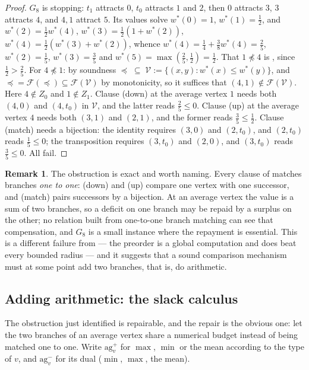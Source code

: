 \documentclass[11pt]{article}
\theoremstyle{plain}
\theoremstyle{definition}
\newtheorem{remark}[theorem]{Remark}
\begin{document}
\begin{proof}
$G_8$ is stopping: $t_1$ attracts $0$, $t_0$ attracts $1$ and $2$, then
$0$ attracts $3$, $3$ attracts $4$, and $4,1$ attract $5$. Its values
solve $w^\ast(0)=1$, $w^\ast(1)=\tfrac12$, and
$w^\ast(2)=\tfrac12w^\ast(4)$,
$w^\ast(3)=\tfrac12(1+w^\ast(2))$,
$w^\ast(4)=\tfrac12(w^\ast(3)+w^\ast(2))$, whence
$w^\ast(4)=\tfrac14+\tfrac38w^\ast(4)=\tfrac25$, $w^\ast(2)=\tfrac15$,
$w^\ast(3)=\tfrac35$ and $w^\ast(5)=\max(\tfrac25,\tfrac12)=\tfrac12$.
That $1\not\preceq4$ is , since
$\tfrac12>\tfrac25$. For $4\not\preceq1$: by soundness
$\preceq\;\subseteq\;\mathcal{V}:=\{(x,y):w^\ast(x)\le w^\ast(y)\}$, and
$\preceq=\mathcal{F}(\preceq)\subseteq\mathcal{F}(\mathcal{V})$ by
monotonicity, so it suffices that $(4,1)\notin\mathcal{F}(\mathcal{V})$.
Here $4\notin Z_0$ and $1\notin Z_1$. Clause (down) at the average vertex
$1$ needs both $(4,0)$ and $(4,t_0)$ in $\mathcal{V}$, and the latter
reads $\tfrac25\le0$. Clause (up) at the average vertex $4$ needs both
$(3,1)$ and $(2,1)$, and the former reads $\tfrac35\le\tfrac12$. Clause
(match) needs a bijection: the identity requires $(3,0)$ and $(2,t_0)$,
and $(2,t_0)$ reads $\tfrac15\le0$; the transposition requires
$(3,t_0)$ and $(2,0)$, and $(3,t_0)$ reads $\tfrac35\le0$. All fail.
\end{proof}

\begin{remark}
The obstruction is exact and worth naming. Every clause of
 matches branches \emph{one to one}: (down) and (up)
compare one vertex with one successor, and (match) pairs successors by a
bijection. At an average vertex the value is a sum of two branches, so a
deficit on one branch may be repaid by a surplus on the other; no
relation built from one-to-one branch matching can see that
compensation, and $G_8$ is a small instance where the repayment is
essential. This is a different failure from
 --- the preorder is a global computation and does
beat every bounded radius --- and it suggests that a sound comparison
mechanism must at some point add two branches, that is, do arithmetic.
\end{remark}

\subsection{Adding arithmetic: the slack calculus}\label{sec:slack}

The obstruction just identified is repairable, and the repair is the
obvious one: let the two branches of an average vertex share a numerical
budget instead of being matched one to one. Write
$\mathrm{ag}^{+}_{v}$ for $\max$, $\min$ or the mean according to the
type of $v$, and $\mathrm{ag}^{-}_{v}$ for its dual ($\min$, $\max$, the
mean).
\end{document}
